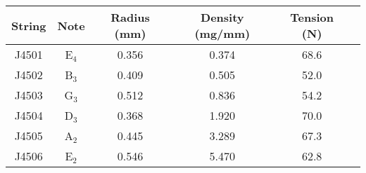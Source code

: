 \begin{tabular}{cccccc}
\toprule
String & Note & Radius (mm) & Density (mg/mm) & Tension (N) \\
\midrule
J4501 & E$_{4}$ & 0.356 & 0.374 & 68.6 \\
J4502 & B$_{3}$ & 0.409 & 0.505 & 52.0 \\
J4503 & G$_{3}$ & 0.512 & 0.836 & 54.2 \\
J4504 & D$_{3}$ & 0.368 & 1.920 & 70.0 \\
J4505 & A$_{2}$ & 0.445 & 3.289 & 67.3 \\
J4506 & E$_{2}$ & 0.546 & 5.470 & 62.8 \\
\bottomrule
\end{tabular}

